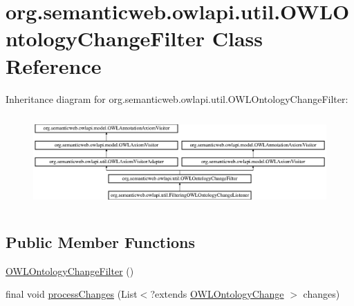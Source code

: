 \hypertarget{classorg_1_1semanticweb_1_1owlapi_1_1util_1_1_o_w_l_ontology_change_filter}{\section{org.\-semanticweb.\-owlapi.\-util.\-O\-W\-L\-Ontology\-Change\-Filter Class Reference}
\label{classorg_1_1semanticweb_1_1owlapi_1_1util_1_1_o_w_l_ontology_change_filter}
}
Inheritance diagram for org.\-semanticweb.\-owlapi.\-util.\-O\-W\-L\-Ontology\-Change\-Filter\-:\begin{figure}[H]
\begin{center}
\leavevmode
\includegraphics[height=3.562341cm]{classorg_1_1semanticweb_1_1owlapi_1_1util_1_1_o_w_l_ontology_change_filter}
\end{center}
\end{figure}
\subsection*{Public Member Functions}
\begin{DoxyCompactItemize}
\item 
\hyperlink{classorg_1_1semanticweb_1_1owlapi_1_1util_1_1_o_w_l_ontology_change_filter_a2b332c3473117a2a4118508777f5e02b}{O\-W\-L\-Ontology\-Change\-Filter} ()
\item 
final void \hyperlink{classorg_1_1semanticweb_1_1owlapi_1_1util_1_1_o_w_l_ontology_change_filter_a387bb86f2616e1ba21694afd79ae4196}{process\-Changes} (List$<$?extends \hyperlink{classorg_1_1semanticweb_1_1owlapi_1_1model_1_1_o_w_l_ontology_change}{O\-W\-L\-Ontology\-Change} $>$ changes)
\end{DoxyCompactItemize}
